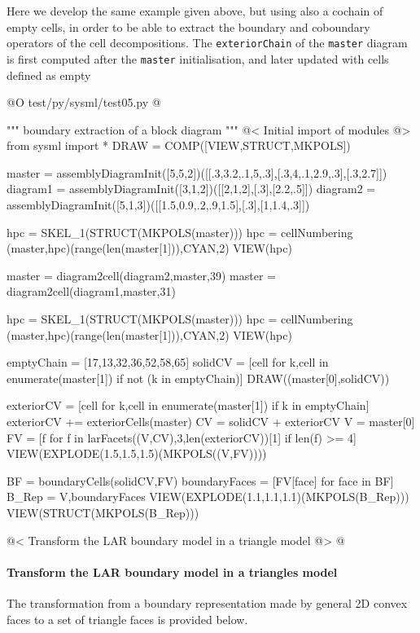 \documentclass[11pt,oneside]{article}	%
\begin{document}
Here we develop the same example \texttt{} given above, but using also a cochain of empty cells,
in order to be able to extract the boundary and coboundary operators of the cell decompositions. 
The \texttt{exteriorChain}
of the \texttt{master} diagram is first computed after the \texttt{master} initialisation, and later updated with cells defined as empty

@O test/py/sysml/test05.py
@{""" boundary extraction of a block diagram """
@< Initial import of modules @>
from sysml import *
DRAW = COMP([VIEW,STRUCT,MKPOLS])

master = assemblyDiagramInit([5,5,2])([[.3,3.2,.1,5,.3],[.3,4,.1,2.9,.3],[.3,2.7]])
diagram1 = assemblyDiagramInit([3,1,2])([[2,1,2],[.3],[2.2,.5]])
diagram2 = assemblyDiagramInit([5,1,3])([[1.5,0.9,.2,.9,1.5],[.3],[1,1.4,.3]])

hpc = SKEL_1(STRUCT(MKPOLS(master)))
hpc = cellNumbering (master,hpc)(range(len(master[1])),CYAN,2)
VIEW(hpc)
 
master = diagram2cell(diagram2,master,39)
master = diagram2cell(diagram1,master,31)

hpc = SKEL_1(STRUCT(MKPOLS(master)))
hpc = cellNumbering (master,hpc)(range(len(master[1])),CYAN,2)
VIEW(hpc)

emptyChain = [17,13,32,36,52,58,65]
solidCV = [cell for k,cell in enumerate(master[1]) if not (k in emptyChain)]
DRAW((master[0],solidCV))

exteriorCV =  [cell for k,cell in enumerate(master[1]) if k in emptyChain]
exteriorCV += exteriorCells(master)
CV = solidCV + exteriorCV
V = master[0]
FV = [f for f in larFacets((V,CV),3,len(exteriorCV))[1] if len(f) >= 4]
VIEW(EXPLODE(1.5,1.5,1.5)(MKPOLS((V,FV))))

BF = boundaryCells(solidCV,FV)
boundaryFaces = [FV[face] for face in BF]
B_Rep = V,boundaryFaces
VIEW(EXPLODE(1.1,1.1,1.1)(MKPOLS(B_Rep)))
VIEW(STRUCT(MKPOLS(B_Rep)))

@< Transform the LAR boundary model in a triangle model @>
@}

\paragraph{Transform the LAR boundary model in a triangles model}
The transformation from a boundary representation made by general 2D convex faces to a set of triangle faces is provided below.
\end{document}
